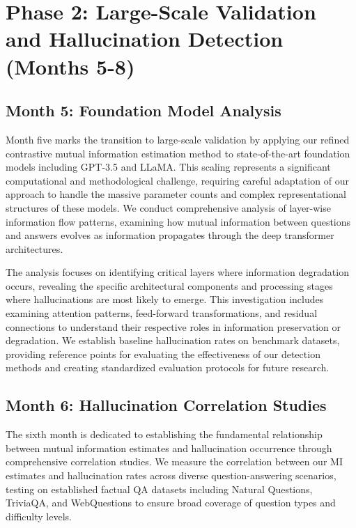 \documentclass[11pt, oneside]{book}
\theoremstyle{plain}
\theoremstyle{definition}
\theoremstyle{remark}
\begin{document}
\section{Phase 2: Large-Scale Validation and Hallucination Detection (Months 5-8)}

\subsection{Month 5: Foundation Model Analysis}

Month five marks the transition to large-scale validation by applying our refined contrastive mutual information estimation method to state-of-the-art foundation models including GPT-3.5 and LLaMA. This scaling represents a significant computational and methodological challenge, requiring careful adaptation of our approach to handle the massive parameter counts and complex representational structures of these models. We conduct comprehensive analysis of layer-wise information flow patterns, examining how mutual information between questions and answers evolves as information propagates through the deep transformer architectures.

The analysis focuses on identifying critical layers where information degradation occurs, revealing the specific architectural components and processing stages where hallucinations are most likely to emerge. This investigation includes examining attention patterns, feed-forward transformations, and residual connections to understand their respective roles in information preservation or degradation. We establish baseline hallucination rates on benchmark datasets, providing reference points for evaluating the effectiveness of our detection methods and creating standardized evaluation protocols for future research.

\subsection{Month 6: Hallucination Correlation Studies}

The sixth month is dedicated to establishing the fundamental relationship between mutual information estimates and hallucination occurrence through comprehensive correlation studies. We measure the correlation between our MI estimates and hallucination rates across diverse question-answering scenarios, testing on established factual QA datasets including Natural Questions, TriviaQA, and WebQuestions to ensure broad coverage of question types and difficulty levels.
\end{document}
